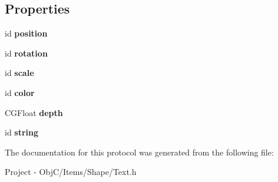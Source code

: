 \subsection*{Properties}
\begin{DoxyCompactItemize}
\item 
\hypertarget{protocol_text_export-p_a752657d2201920039dadbd2194564faf}{}id {\bfseries position}\label{protocol_text_export-p_a752657d2201920039dadbd2194564faf}

\item 
\hypertarget{protocol_text_export-p_a087cb9ddfd5322f200b88cf7048549ce}{}id {\bfseries rotation}\label{protocol_text_export-p_a087cb9ddfd5322f200b88cf7048549ce}

\item 
\hypertarget{protocol_text_export-p_a4788295ac078ab9414b6a8b01558d7e0}{}id {\bfseries scale}\label{protocol_text_export-p_a4788295ac078ab9414b6a8b01558d7e0}

\item 
\hypertarget{protocol_text_export-p_ae8a063e77d9dc9dc32281f95e6b6e1dc}{}id {\bfseries color}\label{protocol_text_export-p_ae8a063e77d9dc9dc32281f95e6b6e1dc}

\item 
\hypertarget{protocol_text_export-p_a829a6f5cabf5631d48b248dca6974e08}{}C\+G\+Float {\bfseries depth}\label{protocol_text_export-p_a829a6f5cabf5631d48b248dca6974e08}

\item 
\hypertarget{protocol_text_export-p_aeb108735037f61fe0d089d076ae1334f}{}id {\bfseries string}\label{protocol_text_export-p_aeb108735037f61fe0d089d076ae1334f}

\end{DoxyCompactItemize}


The documentation for this protocol was generated from the following file\+:\begin{DoxyCompactItemize}
\item 
Project -\/ Obj\+C/\+Items/\+Shape/Text.\+h\end{DoxyCompactItemize}
